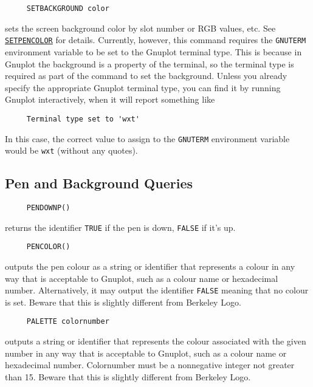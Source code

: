 \begin{verbatim}
     SETBACKGROUND color
\end{verbatim}
sets the screen background color by slot number or RGB values, etc.
See \hyperref[logoturtle:setpencolor]{\texttt{SETPENCOLOR}} for
details.  Currently, however, this command requires the
\texttt{GNUTERM} environment variable to be set to the Gnuplot
terminal type.  This is because in Gnuplot the background is a
property of the terminal, so the terminal type is required as part of
the command to set the background.  Unless you already specify the
appropriate Gnuplot terminal type, you can find it by running Gnuplot
interactively, when it will report something like
\begin{verbatim}
     Terminal type set to 'wxt'
\end{verbatim}
In this case, the correct value to assign to the \texttt{GNUTERM}
environment variable would be \texttt{wxt} (without any quotes).


\subsection{Pen and Background Queries}

\begin{verbatim}
     PENDOWNP()
\end{verbatim}
returns the identifier \texttt{TRUE} if the pen is down,
\texttt{FALSE} if it's up.


\begin{verbatim}
     PENCOLOR()
\end{verbatim}
outputs the pen colour as a string or identifier that represents a
colour in any way that is acceptable to Gnuplot, such as a colour name
or hexadecimal number.  Alternatively, it may output the identifier
\texttt{FALSE} meaning that no colour is set.  Beware that this is
slightly different from Berkeley Logo.

\begin{verbatim}
     PALETTE colornumber
\end{verbatim}
outputs a string or identifier that represents the colour associated
with the given number in any way that is acceptable to Gnuplot, such
as a colour name or hexadecimal number.  Colornumber must be a
nonnegative integer not greater than 15.  Beware that this is slightly
different from Berkeley Logo.

